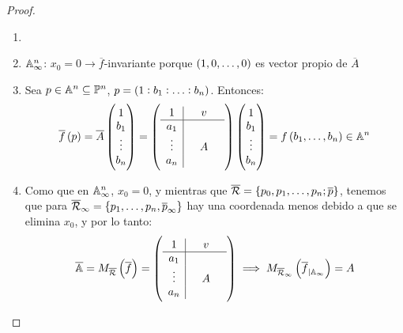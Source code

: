     \begin{proof}
        \begin{enumerate}
            \item[]
            \item $\mathbb{A}_\infty^n$: $x_0=0 \rightarrow \overline{f}$-invariante porque $\left(1,0,\ldots,0\right)$ es vector propio de $\overline{A}$
            \item Sea $p\in\mathbb{A}^n\subseteq\mathbb{P}^n$, $p=\left(1:b_1:\ldots:b_n\right)$. Entonces:
            \begin{gather*}
                \overline{f}\left( p \right) = \overline{A} 
                \begin{pmatrix}
                    1 \\
                    b_1\\
                    \vdots \\
                    b_n\\
                \end{pmatrix}
                = 
                \left(
            \begin{array}{c|ccc}
                1 &  & v &  \\ \hline
                a_1 & & & \\
                \vdots & & A & \\
                a_n & & & 
            \end{array} \right)
            \begin{pmatrix}
                1\\
                b_1\\
                \vdots\\
                b_n\\
            \end{pmatrix}
            = f\left( b_1,\ldots,b_n \right)\in \mathbb{A}^n
            \end{gather*}
            \item Como que en $\mathbb{A}_\infty^n$, $x_0 =0$, y mientras que $\overline{\mathcal{R}}=\{p_0, p_1, \dots, p_n; \overline{p}\}$, tenemos que para $\overline{\mathcal{R}}_\infty = \{p_1, \dots, p_n, \overline{p}_\infty\}$ hay una coordenada menos debido a que se elimina $x_0$, y por lo tanto:
            \begin{gather*}
                \overline{\mathbb{A}} = M_{\overline{\mathcal{R}}}\left( \overline{f}\right) = \left(
                \begin{array}{c|ccc}
                    1 &  & v & \\ \hline
                    a_1 & & & \\
                    \vdots & & A & \\
                    a_n & & & 
                \end{array} \right) 
                \implies 
                M_{\overline{\mathcal{R}}_\infty}\left( \overline{f}_{|\mathbb{A}_\infty} \right) = A
            \end{gather*}
        \end{enumerate}
    \end{proof}
